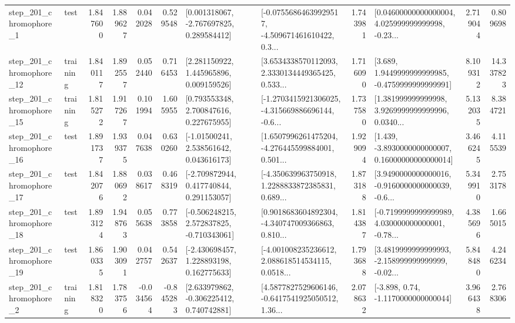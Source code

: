\begin{tabular}{llrrrrllrlrr}
   step\_201\_chromophore\_1 &      test &      1.847600 &    1.889627 &      0.042028 &  0.529548 &    [0.001318067, -2.767697825, 0.289584412] &  [-0.07556864639929517, -4.509671461610422, 0.3... &       1.743981 &  [0.04600000000000004, 4.025999999999998, -0.23... &            2.719044 &          0.809698 \\
  step\_201\_chromophore\_12 &  training &      1.840117 &    1.892557 &      0.052440 &  0.716453 &     [2.281150922, 1.445965896, 0.009159526] &  [3.6534338570112093, 2.3330134449365425, 0.533... &       1.716090 &   [3.689, 1.9449999999999985, -0.4759999999999991] &            8.109312 &         14.337823 \\
  step\_201\_chromophore\_15 &  training &      1.815272 &    1.917267 &      0.101994 &  1.605955 &     [0.793553348, 2.700847616, 0.227675955] &  [-1.2703415921306025, -4.315669886696144, -0.6... &       1.737580 &  [1.381999999999998, 3.9269999999999996, 0.0340... &            5.132035 &          8.384721 \\
  step\_201\_chromophore\_16 &      test &      1.891737 &    1.939375 &      0.047638 &  0.630260 &     [-1.01500241, 2.538561642, 0.043616173] &  [1.6507996261475204, -4.276445599884001, 0.501... &       1.929094 &  [1.439, -3.8930000000000007, 0.16000000000000014] &            3.466245 &          4.115539 \\
  step\_201\_chromophore\_17 &      test &      1.842076 &    1.880692 &      0.038617 &  0.468319 &    [-2.709872944, 0.417740844, 0.291153057] &  [-4.350639963750918, 1.2288833872385831, 0.689... &       1.873188 &  [3.9490000000000016, -0.9160000000000039, -0.6... &            5.349910 &          2.753178 \\
  step\_201\_chromophore\_18 &      test &      1.893124 &    1.948763 &      0.055638 &  0.773858 &   [-0.506248215, 2.572837825, -0.710343061] &  [0.9018683604892304, -4.340747009366863, 0.810... &       1.814387 &  [-0.7199999999999989, 4.030000000000001, -0.78... &            4.385696 &          1.665015 \\
  step\_201\_chromophore\_19 &      test &      1.860335 &    1.903091 &      0.042757 &  0.542637 &    [-2.430698457, 1.228893198, 0.162775633] &  [-4.001008235236612, 2.088618514534115, 0.0518... &       1.793688 &  [3.4819999999999993, -2.158999999999999, -0.02... &            5.848480 &          4.246234 \\
   step\_201\_chromophore\_2 &  training &      1.818320 &    1.783756 &     -0.034564 & -0.845283 &    [2.633979862, -0.306225412, 0.740742881] &  [4.5877827529606146, -0.6417541925050512, 1.36... &       2.078632 &                [-3.898, 0.74, -1.1170000000000044] &            3.966438 &          2.768306 \\

\end{tabular}
